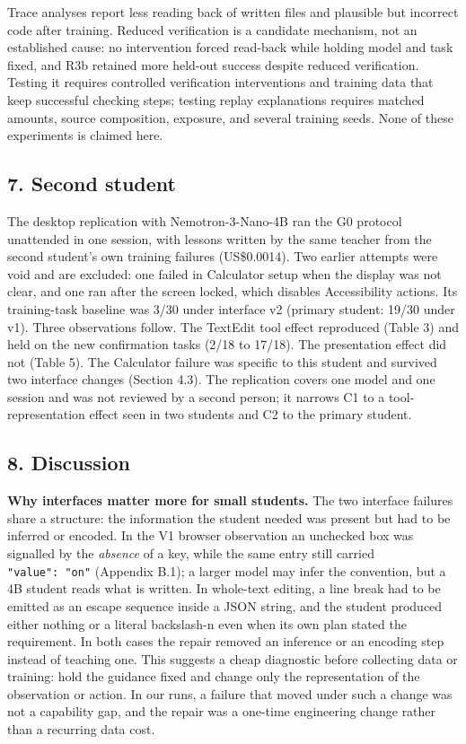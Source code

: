 \documentclass[
  10pt,
]{article}
\begin{document}
Trace analyses report less reading back of written files and plausible
but incorrect code after training. Reduced verification is a candidate
mechanism, not an established cause: no intervention forced read-back
while holding model and task fixed, and R3b retained more held-out
success despite reduced verification. Testing it requires controlled
verification interventions and training data that keep successful
checking steps; testing replay explanations requires matched amounts,
source composition, exposure, and several training seeds. None of these
experiments is claimed here.

\subsection{7. Second student}\label{second-student}

The desktop replication with Nemotron-3-Nano-4B ran the G0 protocol
unattended in one session, with lessons written by the same teacher from
the second student's own training failures (US\$0.0014). Two earlier
attempts were void and are excluded: one failed in Calculator setup when
the display was not clear, and one ran after the screen locked, which
disables Accessibility actions. Its training-task baseline was 3/30
under interface v2 (primary student: 19/30 under v1). Three observations
follow. The TextEdit tool effect reproduced (Table 3) and held on the
new confirmation tasks (2/18 to 17/18). The presentation effect did not
(Table 5). The Calculator failure was specific to this student and
survived two interface changes (Section 4.3). The replication covers one
model and one session and was not reviewed by a second person; it
narrows C1 to a tool-representation effect seen in two students and C2
to the primary student.

\subsection{8. Discussion}\label{discussion}

\textbf{Why interfaces matter more for small students.} The two
interface failures share a structure: the information the student needed
was present but had to be inferred or encoded. In the V1 browser
observation an unchecked box was signalled by the \emph{absence} of a
key, while the same entry still carried \texttt{"value":\ "on"}
(Appendix B.1); a larger model may infer the convention, but a 4B
student reads what is written. In whole-text editing, a line break had
to be emitted as an escape sequence inside a JSON string, and the
student produced either nothing or a literal backslash-n even when its
own plan stated the requirement. In both cases the repair removed an
inference or an encoding step instead of teaching one. This suggests a
cheap diagnostic before collecting data or training: hold the guidance
fixed and change only the representation of the observation or action.
In our runs, a failure that moved under such a change was not a
capability gap, and the repair was a one-time engineering change rather
than a recurring data cost.
\end{document}

